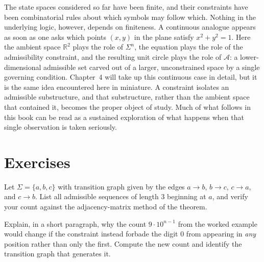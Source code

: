 The state spaces considered so far have been finite, and their constraints
have been combinatorial rules about which symbols may follow which. Nothing
in the underlying logic, however, depends on finiteness. A continuous
analogue appears as soon as one asks which points $(x,y)$ in the plane
satisfy $x^2 + y^2 = 1$. Here the ambient space $\mathbb{R}^2$ plays the role
of $\Sigma^n$, the equation plays the role of the admissibility constraint,
and the resulting unit circle plays the role of $\mathcal{A}$: a
lower-dimensional admissible set carved out of a larger, unconstrained space
by a single governing condition. Chapter~4 will take up this continuous case
in detail, but it is the same idea encountered here in miniature. A
constraint isolates an admissible substructure, and that substructure,
rather than the ambient space that contained it, becomes the proper object of
study. Much of what follows in this book can be read as a sustained
exploration of what happens when that single observation is taken seriously.

\section{Exercises}
\begin{exercise}
Let $\Sigma = \{a, b, c\}$ with transition graph given by the edges
$a \to b$, $b \to c$, $c \to a$, and $c \to b$. List all admissible sequences
of length $3$ beginning at $a$, and verify your count against the
adjacency-matrix method of the theorem.
\end{exercise}

\begin{exercise}
Explain, in a short paragraph, why the count $9 \cdot 10^{n-1}$ from the
worked example would change if the constraint instead forbade the digit $0$
from appearing in \emph{any} position rather than only the first. Compute the
new count and identify the transition graph that generates it.
\end{exercise}
